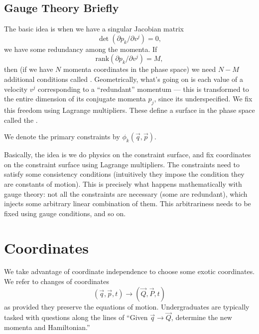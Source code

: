 \subsection{Gauge Theory Briefly}

\M
The basic idea is when we have a singular Jacobian matrix
\begin{equation}
\det(\partial p_{k}/\partial v^{j})=0,
\end{equation}
we have some redundancy among the momenta. If
\begin{equation}
\mathrm{rank}(\partial p_{k}/\partial v^{j})=M,
\end{equation}
then (if we have $N$ momenta coordinates in the phase space) we need $N-M$ additional conditions called .
Geometrically, what's going on is each value of a velocity $v^{j}$
corresponding to a ``redundant'' momentum --- this is transformed to the
entire dimension of its conjugate momenta $p_{j}$, since its
underspecified. We fix this freedom using Lagrange multipliers.
These define a surface in the phase space called the .

We denote the primary constraints by $\phi_{k}(\vec{q},\vec{p})$.

\M
Basically, the idea is we do physics on the constraint surface, and fix
coordinates on the constraint surface using Lagrange multipliers. The
constraints need to satisfy some consistency conditions (intuitively
they impose the condition they are constants of motion). This is
precisely what happens mathematically with gauge theory: not all the
constraints are necessary (some are redundant), which injects some
arbitrary linear combination of them. This arbitrariness needs to be
fixed using gauge conditions, and so on.

\section{Coordinates}

\M
We take advantage of coordinate independence to choose some exotic
coordinates. We refer to changes of coordinates
\begin{equation}
(\vec{q}, \vec{p},t)\to(\vec{Q},\vec{P},t)
\end{equation}
as  provided they preserve the
equations of motion. Undergraduates are typically tasked with questions
along the lines of ``Given $\vec{q}\to\vec{Q}$, determine the new
momenta and Hamiltonian.''

